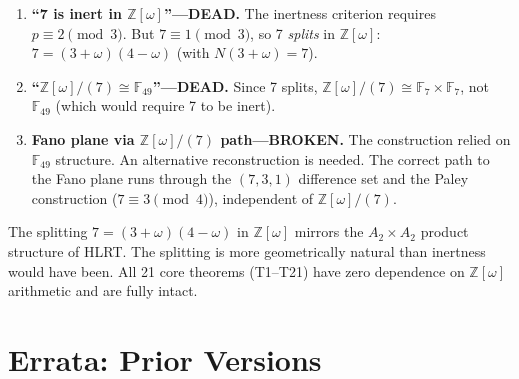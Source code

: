 \documentclass[11pt,letterpaper]{article}
\begin{document}
\begin{enumerate}[label=\textbf{E-8.3.\arabic*.},nosep]
  \item \textbf{``7 is inert in $\mathbb{Z}[\omega]$''---DEAD.}
        The inertness criterion requires $p\equiv2\pmod{3}$.
        But $7\equiv1\pmod{3}$, so 7 \emph{splits} in $\mathbb{Z}[\omega]$:
        $7 = (3+\omega)(4-\omega)$ (with $N(3+\omega) = 7$).

  \item \textbf{``$\mathbb{Z}[\omega]/(7) \cong \mathbb{F}_{49}$''---DEAD.}
        Since 7 splits, $\mathbb{Z}[\omega]/(7) \cong \mathbb{F}_7\times\mathbb{F}_7$,
        not $\mathbb{F}_{49}$ (which would require 7 to be inert).

  \item \textbf{Fano plane via $\mathbb{Z}[\omega]/(7)$ path---BROKEN.}
        The construction relied on $\mathbb{F}_{49}$ structure.
        An alternative reconstruction is needed.  The correct path to the
        Fano plane runs through the $(7,3,1)$ difference set and the
        Paley construction ($7\equiv3\pmod{4}$), independent of
        $\mathbb{Z}[\omega]/(7)$.
\end{enumerate}

\begin{tcolorbox}[colback=hlrtgreen!5!white,colframe=hlrtgreen,title=Positive Result]
The splitting $7 = (3+\omega)(4-\omega)$ in $\mathbb{Z}[\omega]$ mirrors
the $A_2\times A_2$ product structure of HLRT.  The splitting is more
geometrically natural than inertness would have been.
All 21 core theorems (T1--T21) have zero dependence on $\mathbb{Z}[\omega]$
arithmetic and are fully intact.
\end{tcolorbox}

\section{Errata: Prior Versions}
\end{document}
